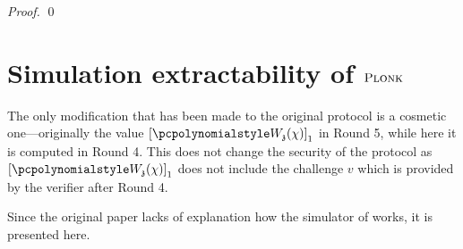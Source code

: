 \documentclass[runningheads,11pt]{llncs}
\let\spvec\vec
\let\vec\accentvec
\let\vec\spvec
\def\vec#1{\mathchoice{\mbox{\boldmath$\displaystyle#1$}}
	{\mbox{\boldmath$\textstyle#1$}}
	{\mbox{\boldmath$\scriptstyle#1$}}
	{\mbox{\boldmath$\scriptscriptstyle#1$}}}
\theoremstyle{definition}
\begin{document}
\begin{proof}
	\qed
\end{proof}

\section{Simulation extractability of $\textsc{Plonk}$}
The only modification that has been made to the original \plonk{} protocol is a cosmetic one---originally the value $\gone{\p{W}_{\chz}(\chi)}$ in Round 5, while here it is computed in Round 4. This does not change the security of the protocol as $\gone{\p{W}_{\chz}(\chi)}$ does not include the challenge $v$ which is provided by the verifier after Round 4. 

Since the original paper \cite{EPRINT:GabWilCio19} lacks of explanation how the simulator of \plonk{} works, it is presented here.
\end{document}
